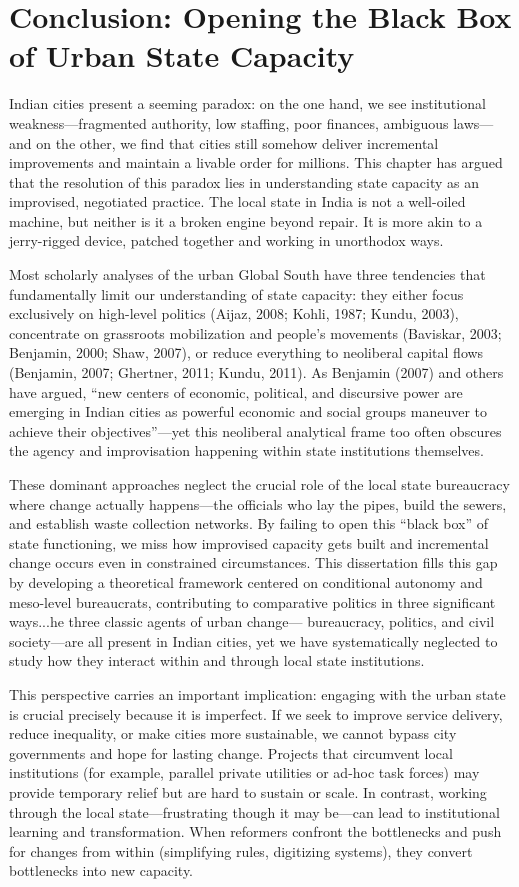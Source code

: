 \section{Conclusion: Opening the Black Box of Urban State Capacity}

Indian cities present a seeming paradox: on the one hand, we see institutional weakness—fragmented authority, low staffing, poor finances, ambiguous laws—and on the other, we find that cities still somehow deliver incremental improvements and maintain a livable order for millions. This chapter has argued that the resolution of this paradox lies in understanding state capacity as an improvised, negotiated practice. The local state in India is not a well-oiled machine, but neither is it a broken engine beyond repair. It is more akin to a jerry-rigged device, patched together and working in unorthodox ways.

Most scholarly analyses of the urban Global South have three tendencies that fundamentally limit our understanding of state capacity: they either focus exclusively on high-level politics (Aijaz, 2008; Kohli, 1987; Kundu, 2003), concentrate on grassroots mobilization and people's movements (Baviskar, 2003; Benjamin, 2000; Shaw, 2007), or reduce everything to neoliberal capital flows (Benjamin, 2007; Ghertner, 2011; Kundu, 2011). As Benjamin (2007) and others have argued, ``new centers of economic, political, and discursive power are emerging in Indian cities as powerful economic and social groups maneuver to achieve their objectives''—yet this neoliberal analytical frame too often obscures the agency and improvisation happening within state institutions themselves.

These dominant approaches neglect the crucial role of the local state bureaucracy where change actually happens—the officials who lay the pipes, build the sewers, and establish waste collection networks. By failing to open this ``black box'' of state functioning, we miss how improvised capacity gets built and incremental change occurs even in constrained circumstances. This dissertation fills this gap by developing a theoretical framework centered on conditional autonomy and meso-level bureaucrats, contributing to comparative politics in three significant ways...he three classic agents of urban change— bureaucracy, politics, and civil society—are all present in Indian cities, yet we have systematically neglected to study how they interact within and through local state institutions.

This perspective carries an important implication: engaging with the urban state is crucial precisely because it is imperfect. If we seek to improve service delivery, reduce inequality, or make cities more sustainable, we cannot bypass city governments and hope for lasting change. Projects that circumvent local institutions (for example, parallel private utilities or ad-hoc task forces) may provide temporary relief but are hard to sustain or scale. In contrast, working through the local state—frustrating though it may be—can lead to institutional learning and transformation. When reformers confront the bottlenecks and push for changes from within (simplifying rules, digitizing systems), they convert bottlenecks into new capacity.


